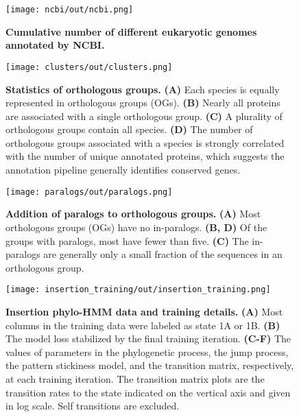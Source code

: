 \begin{figure}[h!]
\texttt{[image: ncbi/out/ncbi.png]}
\centering
\caption{\textbf{Cumulative number of different eukaryotic genomes annotated by NCBI.}}
\label{sfig:ncbi}
\end{figure}

\begin{figure}[h!]
\texttt{[image: clusters/out/clusters.png]}
\centering
\caption{\textbf{Statistics of orthologous groups.}
\textbf{(A)} Each species is equally represented in orthologous groups (OGs). \textbf{(B)} Nearly all proteins are associated with a single orthologous group. \textbf{(C)} A plurality of orthologous groups contain all species. \textbf{(D)} The number of orthologous groups associated with a species is strongly correlated with the number of unique annotated proteins, which suggests the annotation pipeline generally identifies conserved genes.}
\label{sfig:clusters}
\end{figure}

\begin{figure}[h!]
\texttt{[image: paralogs/out/paralogs.png]}
\centering
\caption{\textbf{Addition of paralogs to orthologous groups.}
\textbf{(A)} Most orthologous groups (OGs) have no in-paralogs. \textbf{(B, D)} Of the groups with paralogs, most have fewer than five. \textbf{(C)} The in-paralogs are generally only a small fraction of the sequences in an orthologous group.}
\label{sfig:paralogs}
\end{figure}

\begin{figure}[h!]
\texttt{[image: insertion\_training/out/insertion\_training.png]}
\centering
\caption{\textbf{Insertion phylo-HMM data and training details.}
\textbf{(A)} Most columns in the training data were labeled as state 1A or 1B. \textbf{(B)} The model loss stabilized by the final training iteration. \textbf{(C-F)} The values of parameters in the phylogenetic process, the jump process, the pattern stickiness model, and the transition matrix, respectively, at each training iteration. The transition matrix plots are the transition rates to the state indicated on the vertical axis and given in log scale. Self transitions are excluded.}
\label{sfig:insertion_training}
\end{figure}

